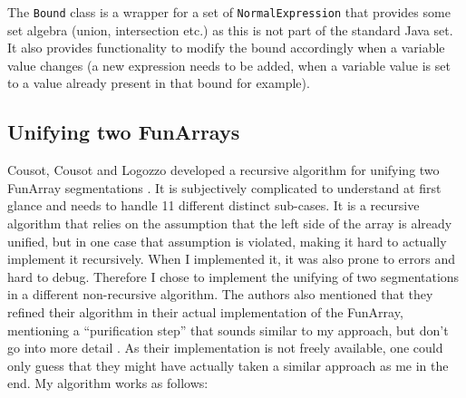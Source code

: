 The \texttt{Bound} class is a wrapper for a set of \texttt{NormalExpression} that provides some set algebra (union, intersection etc.) as this is not part of the standard Java set. It also provides functionality to modify the bound accordingly when a variable value changes (a new expression needs to be added, when a variable value is set to a value already present in that bound for example).

\subsection{Unifying two FunArrays}\label{sec:funarray:unifying}

Cousot, Cousot and Logozzo developed a recursive algorithm for unifying two FunArray segmentations \cite{cousot2011}. It is subjectively complicated to understand at first glance and needs to handle 11 different distinct sub-cases. It is a recursive algorithm that relies on the assumption that the left side of the array is already unified, but in one case that assumption is violated, making it hard to actually implement it recursively. When I implemented it, it was also prone to errors and hard to debug. Therefore I chose to implement the unifying of two segmentations in a different non-recursive algorithm. The authors also mentioned that they refined their algorithm in their actual implementation of the FunArray, mentioning a ``purification step'' that sounds similar to my approach, but don't go into more detail \cite[section 12.2]{cousot2011}. As their implementation is not freely available, one could only guess that they might have actually taken a similar approach as me in the end. My algorithm works as follows:

